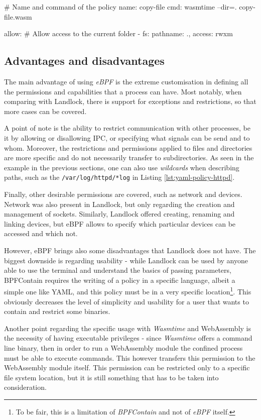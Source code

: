 \begin{code}[language=yaml, caption=Running WASM with BPFContain., label=lst:yaml-policy-wasm]
# Name and command of the policy
name: copy-file
cmd: wasmtime --dir=. copy-file.wasm

allow:
  # Allow access to the current folder
  - fs: {pathname: ., access: rwxm}
\end{code}

\subsection{Advantages and disadvantages}

The main advantage of using \textit{eBPF} is the extreme customisation in defining all the
permissions and capabilities that a process can have. Most notably, when comparing with Landlock,
there is support for exceptions and restrictions, so that more cases can be covered.

A point of note is the ability to restrict communication with other processes, be it by allowing
or disallowing IPC, or specifying what signals can be send and to whom.
Moreover, the restrictions and permissions applied to files and directories are more specific and do not
necessarily transfer to subdirectories. As seen in the example in the previous sections,
one can also use \textit{wildcards} when describing paths, such as the \texttt{/var/log/httpd/*log}
in Listing \ref{lst:yaml-policy-httpd}.

Finally, other desirable permissions are covered, such as network and devices. Network was also present
in Landlock, but only regarding the creation and management of sockets. Similarly, Landlock offered
creating, renaming and linking devices, but eBPF allows to specify which particular devices can be accessed
and which not.

However, eBPF brings also some disadvantages that Landlock does not have.
The biggest downside is regarding usability - while Landlock can be used by anyone able to use
the terminal and understand the basics of passing parameters, BPFContain requires the writing
of a policy in a specific language, albeit a simple one like YAML, and this policy must be in a very
specific location\footnote{To be fair, this is a limitation of \textit{BPFContain} and not of \textit{eBPF} itself.}.
This obviously decreases the level of simplicity and usability for a user that wants to contain and restrict
some binaries.

Another point regarding the specific usage with \textit{Wasmtime} and WebAssembly is the necessity of
having executable privileges - since \textit{Wasmtime} offers a command line binary, then in order to run
a WebAssembly module the confined process must be able to execute commands. This however transfers this
permission to the WebAssembly module itself. This permission can be restricted only to a specific file system
location, but it is still something that has to be taken into consideration.

